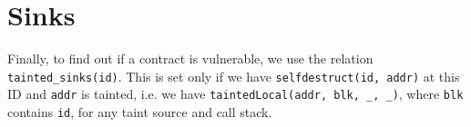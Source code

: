 \documentclass[10pt]{article}
\newcommand{\solidity}[1]{\texttt{#1}}
\begin{document}
\section{Sinks}
Finally, to find out if a contract is vulnerable, we use the relation \texttt{tainted\_sinks(id)}.
This is set only if we have \solidity{selfdestruct(id, addr)} at this ID and \texttt{addr} is tainted, i.e. we have \texttt{taintedLocal(addr, blk, \_, \_)}, where \texttt{blk} contains \texttt{id}, for any taint source and call stack.
\end{document}
